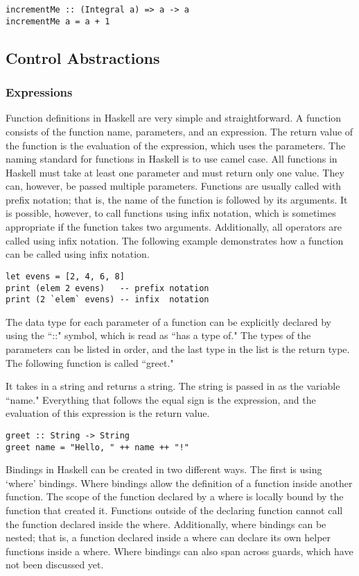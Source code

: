 \documentclass[titlepage,12pt]{article}
\begin{document}
\begin{verbatim}
incrementMe :: (Integral a) => a -> a
incrementMe a = a + 1
\end{verbatim}

\subsection{Control Abstractions}
\subsubsection{Expressions}

Function definitions in Haskell are very simple and straightforward. A function consists of the function name, 
parameters, and an expression. The return value of the function is the evaluation of the expression, which 
uses the parameters. The naming standard for functions in Haskell is to use camel case. All functions in 
Haskell must take at least one parameter and must return only one value. They can, however, be passed 
multiple parameters. Functions are usually called with prefix notation; that is, the name of the function is 
followed by its arguments. It is possible, however, to call functions using infix notation, which is sometimes appropriate 
if the function takes two arguments. Additionally, all operators are called using infix notation. The following example 
demonstrates how a function can be called using infix notation. 

\begin{verbatim}
let evens = [2, 4, 6, 8]
print (elem 2 evens)   -- prefix notation
print (2 `elem` evens) -- infix  notation
\end{verbatim}

The data type for each parameter of a function can be explicitly declared by using the ``::" symbol, which is 
read as ``has a type of." The types of the parameters can be listed in order, and the last type in the list 
is the return type. The following function is called ``greet."

It takes in a string and returns a string. The string is passed in as the variable ``name." Everything that follows the equal sign is the expression, and the evaluation of this expression is the return value. 

\begin{verbatim}
greet :: String -> String
greet name = "Hello, " ++ name ++ "!"
\end{verbatim}

Bindings in Haskell can be created in two different ways. The first is using `where' bindings. Where bindings allow 
the definition of a function inside another function. The scope of the function declared by a where is locally bound 
by the function that created it. Functions outside of the declaring function cannot call the function declared inside 
the where. Additionally, where bindings can be nested; that is, a function declared inside a where can declare its 
own helper functions inside a where. Where bindings can also span across guards, which have not been discussed yet. 
\end{document}
